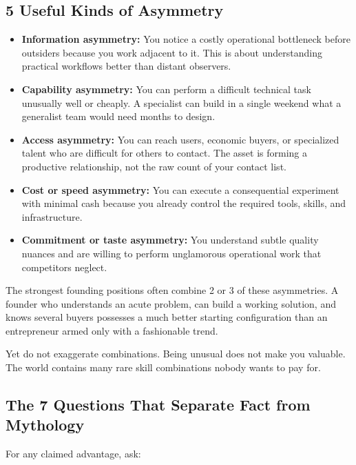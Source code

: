\subsection{5 Useful Kinds of Asymmetry}

\begin{itemize}[leftmargin=11pt,itemsep=2pt,topsep=1.5pt,parsep=0pt]
  \item \textbf{Information asymmetry:} You notice a costly operational bottleneck before outsiders because you work adjacent to it. This is about understanding practical workflows better than distant observers.
  \item \textbf{Capability asymmetry:} You can perform a difficult technical task unusually well or cheaply. A specialist can build in a single weekend what a generalist team would need months to design.
  \item \textbf{Access asymmetry:} You can reach users, economic buyers, or specialized talent who are difficult for others to contact. The asset is forming a productive relationship, not the raw count of your contact list.
  \item \textbf{Cost or speed asymmetry:} You can execute a consequential experiment with minimal cash because you already control the required tools, skills, and infrastructure.
  \item \textbf{Commitment or taste asymmetry:} You understand subtle quality nuances and are willing to perform unglamorous operational work that competitors neglect.
\end{itemize}

The strongest founding positions often combine 2 or 3 of these asymmetries. A founder who understands an acute problem, can build a working solution, and knows several buyers possesses a much better starting configuration than an entrepreneur armed only with a fashionable trend.

Yet do not exaggerate combinations. Being unusual does not make you valuable. The world contains many rare skill combinations nobody wants to pay for.

\subsection{The 7 Questions That Separate Fact from Mythology}

For any claimed advantage, ask:

